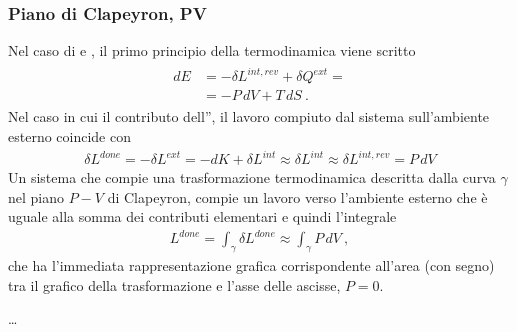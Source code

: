 \documentclass[letterpaper,10pt,italian]{jupyterBook}
\begin{document}
\subsubsection{Piano di Clapeyron, P\sphinxhyphen{}V}
\label{\detokenize{ch/thermodynamics/principles-phase-diagrams:piano-di-clapeyron-p-v}}\label{\detokenize{ch/thermodynamics/principles-phase-diagrams:physics-hs-thermodynamics-foundation-principles-phase-diagrams-gas-1-pv}}
\sphinxAtStartPar
{}
Nel caso di  e , il primo principio della termodinamica viene scritto
\begin{equation*}
\begin{split}\begin{aligned}
  d E & = - \delta L^{int,rev} + \delta Q^{ext} = \\
      & = - P \, dV + T \, dS \ .
\end{aligned}\end{split}
\end{equation*}
\sphinxAtStartPar
Nel caso in cui il contributo dell”, il lavoro compiuto dal sistema sull’ambiente esterno coincide con
\begin{equation*}
\begin{split}\delta L^{done} = - \delta L^{ext} = - d K + \delta L^{int} \approx \delta L^{int} \approx \delta L^{int,rev} =  P \, dV\end{split}
\end{equation*}
\sphinxAtStartPar
Un sistema che compie una trasformazione termodinamica descritta dalla curva \(\gamma\) nel piano \(P-V\) di Clapeyron, compie un lavoro verso l’ambiente esterno che è uguale alla somma dei contributi elementari \sphinxhyphen{} e quindi l’integrale
\begin{equation*}
\begin{split}L^{done} = \int_{\gamma} \delta L^{done} \approx \int_{\gamma} P \, d V \ ,\end{split}
\end{equation*}
\sphinxAtStartPar
che ha l’immediata rappresentazione grafica corrispondente all’area (con segno) tra il grafico della trasformazione e l’asse delle ascisse, \(P=0\).

\sphinxAtStartPar
{}
…
\end{document}
